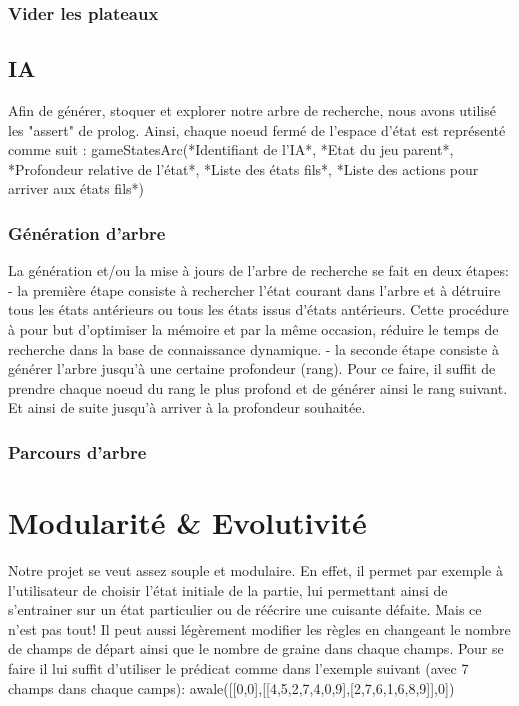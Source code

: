 \documentclass[]{article}
\begin{document}
\subsubsection{Vider les plateaux}



\subsection{IA}

Afin de générer, stoquer et explorer notre arbre de recherche, nous avons utilisé les "assert" de prolog. Ainsi, chaque noeud fermé de l'espace d'état est représenté comme suit :
	gameStatesArc(*Identifiant de l'IA*, *Etat du jeu parent*, *Profondeur relative de l'état*, *Liste des états fils*, *Liste des actions pour arriver aux états fils*)

\subsubsection{Génération d'arbre}

La génération et/ou la mise à jours de l'arbre de recherche se fait en deux étapes:
	- la première étape consiste à rechercher l'état courant dans l'arbre et à détruire tous les états antérieurs ou tous les états issus d'états antérieurs. Cette procédure à pour but d'optimiser la mémoire et par la même occasion, réduire le temps de recherche dans la base de connaissance dynamique.
	- la seconde étape consiste à générer l'arbre jusqu'à une certaine profondeur (rang). Pour ce faire, il suffit de prendre chaque noeud du rang le plus profond et de générer ainsi le rang suivant. Et ainsi de suite jusqu'à arriver à la profondeur souhaitée.

\subsubsection{Parcours d'arbre}

\section{Modularité \& Evolutivité}

Notre projet se veut assez souple et modulaire. En effet, il permet par exemple à l'utilisateur de choisir l'état initiale de la partie, lui permettant ainsi de s'entrainer sur un état particulier ou de réécrire une cuisante défaite.
Mais ce n'est pas tout! Il peut aussi légèrement modifier les règles en changeant le nombre de champs de départ ainsi que le nombre de graine dans chaque champs. Pour se faire il lui suffit d'utiliser le prédicat comme dans l'exemple suivant (avec 7 champs dans chaque camps):
	awale([[0,0],[[4,5,2,7,4,0,9],[2,7,6,1,6,8,9]],0])
	
\end{document}
